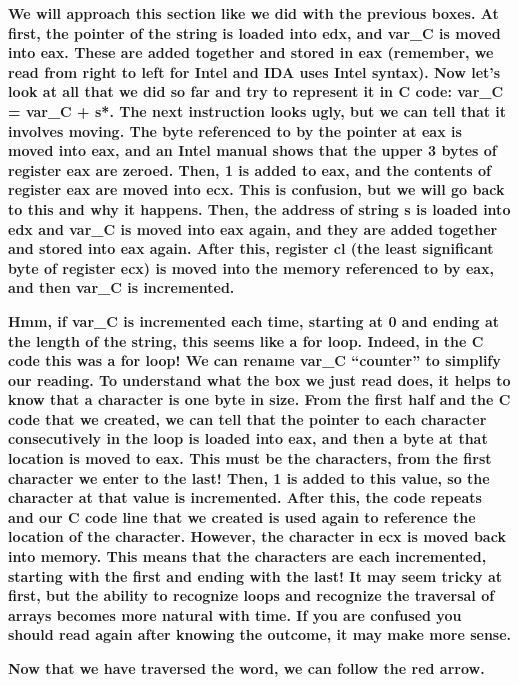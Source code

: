 \documentclass[letterpaper]{article}
\begin{document}
\textbf{We will approach this section like we did with the previous boxes. At first, the pointer of the string is loaded
into edx, and var\_C is moved into eax. These are added together and stored in eax (remember, we read from right to
left for Intel and IDA uses Intel syntax). Now let's look at all that we did so far and try to represent it in C code:
var\_C = var\_C + s*. The next instruction looks ugly, but we can tell that it involves moving. The byte referenced to
by the pointer at eax is moved into eax, and an Intel manual shows that the upper 3 bytes of register eax are zeroed.
Then, 1 is added to eax, and the contents of register eax are moved into ecx. This is confusion, but we will go back to
this and why it happens. Then, the address of string s is loaded into edx and var\_C is moved into eax again, and they
are added together and stored into eax again. After this, register cl (the least significant byte of register ecx) is
moved into the memory referenced to by eax, and then var\_C is incremented.}

\textbf{Hmm, if var\_C is incremented each time, starting at 0 and ending at the length of the string, this seems like a
for loop. Indeed, in the C code this was a for loop! We can rename var\_C ``counter'' to simplify our reading. To
understand what the box we just read does, it helps to know that a character is one byte in size. From the first half
and the C code that we created, we can tell that the pointer to each character consecutively in the loop is loaded into
eax, and then a byte at that location is moved to eax. This must be the characters, from the first character we enter
to the last! Then, 1 is added to this value, so the character at that value is incremented. After this, the code
repeats and our C code line that we created is used again to reference the location of the character. However, the
character in ecx is moved back into memory. This means that the characters are each incremented, starting with the
first and ending with the last! It may seem tricky at first, but the ability to recognize loops and recognize the
traversal of arrays becomes more natural with time. If you are confused you should read again after knowing the
outcome, it may make more sense.}

\textbf{Now that we have traversed the word, we can follow the red arrow.}
\end{document}
